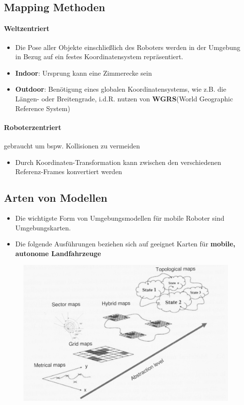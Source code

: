 \subsection{Mapping Methoden}
\paragraph{Weltzentriert}
\begin{itemize}
	\item Die Pose aller Objekte einschließlich des Roboters werden in der Umgebung in Bezug auf ein festes Koordinatensystem repräsentiert.
	\item \textbf{Indoor}: Ursprung kann eine Zimmerecke sein
	\item \textbf{Outdoor}: Benötigung eines globalen Koordinatensystems, wie z.B. die Längen- oder Breitengrade, i.d.R. nutzen von \textbf{WGRS}(World Geographic Reference System)
\end{itemize}
\paragraph{Roboterzentriert} gebraucht um bspw. Kollisionen zu vermeiden
\begin{itemize}
	\item Durch Koordinaten-Transformation kann zwischen den verschiedenen Referenz-Frames konvertiert werden
\end{itemize}
\subsection{Arten von Modellen}
\begin{itemize}
	\item Die wichtigste Form von Umgebungsmodellen für mobile Roboter sind Umgebungskarten.
	\item Die folgende Ausführungen beziehen sich auf geeignet Karten für \textbf{mobile, autonome Landfahrzeuge}
\end{itemize}
\begin{figure}[H]
	\begin{center}
		\includegraphics[scale=0.42]{Resources/PNG/MapTypes.PNG}
		\caption{}
		\label{fig:PNG/MapTypes.PNG}
	\end{center}
\end{figure}
